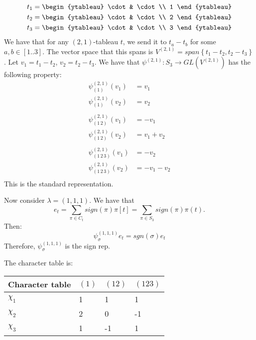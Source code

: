 \documentclass[]{article}
\begin{document}
\begin{align*}
	t_1 &= \begin{ytableau}
		\cdot & \cdot \\
		1
	\end{ytableau}
	\\
	t_2 &= \begin{ytableau}
		\cdot & \cdot \\
		2
	\end{ytableau}
	\\
	t_3 &= \begin{ytableau}
		\cdot & \cdot \\
		3
	\end{ytableau}
\end{align*}
We have that for any $(2,1)$-tableau $t$, we send it to $t_a - t_b$ for some $a, b \in [1..3]$. The vector space that this spans is $V^{(2,1)} = span \left\{t_1 - t_2, t_2 - t_3\right\}$. Let $v_1 = t_1 - t_2$, $v_2 = t_2 - t_3$. 
We have that $\psi^{(2, 1)} : S_3 \rightarrow GL(V^{(2,1)})$ has the following property:
\begin{align*}
	\psi^{(2, 1)}_{(1)}(v_1) &= v_1\\
	\psi^{(2, 1)}_{(1)}(v_2) &= v_2\\
	\\
	\psi^{(2, 1)}_{(1\, 2)}(v_1) &= - v_1\\
	\psi^{(2, 1)}_{(1\, 2)}(v_2) &= v_1 + v_2\\
	\\
	\psi^{(2, 1)}_{(1\, 2 \, 3)}(v_1) &= - v_2\\
	\psi^{(2, 1)}_{(1\, 2 \, 3)}(v_2) &= - v_1 - v_2\\
\end{align*}
This is the standard representation. 

Now consider $\lambda = (1,1,1)$. We have that \begin{equation}
	e_t = \sum_{\pi \in C_t} sign(\pi) \pi[t] = \sum_{\pi \in S_3} sign(\pi) \pi(t).
\end{equation} Then:
\begin{equation}
	\psi^{(1,1,1)}_{\sigma} e_t = sgn(\sigma) e_t
\end{equation}
Therefore, $\psi^{(1,1,1)}_{\sigma}$ is the sign rep. 

The character table is:
\begin{table}[h!]
	\centering
	\begin{tabular}{|l|l|l|l|}
		\hline
		Character table & $(1)$ & $(12)$ & $(123)$ \\ \hline
		$\chi_1$        & 1     & 1      & 1       \\ \hline
		$\chi_2$        & 2     & 0      & -1      \\ \hline
		$\chi_3$        & 1     & -1     & 1       \\ \hline
	\end{tabular}
\end{table}
\end{document}
